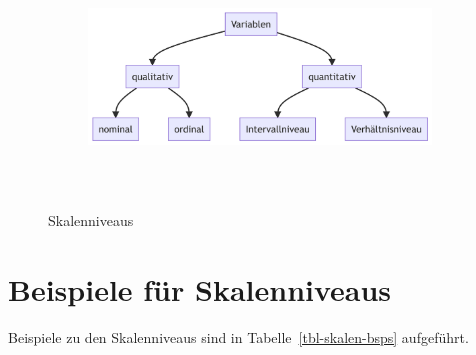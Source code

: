 \documentclass[
  a4paper,
  DIV=11]{scrreprt}
\theoremstyle{definition}
\theoremstyle{definition}
\theoremstyle{remark}
\begin{document}
\begin{figure}

{\centering 

\begin{figure}[H]

{\centering \includegraphics[width=6.03in,height=2.41in]{./fragenstellen_files/figure-latex/mermaid-figure-2.png}

}

\end{figure}

}

\caption{\label{fig-skalenniveau}Skalenniveaus}

\end{figure}

\hypertarget{beispiele-fuxfcr-skalenniveaus}{%
\section{Beispiele für
Skalenniveaus}\label{beispiele-fuxfcr-skalenniveaus}}

Beispiele zu den Skalenniveaus sind in Tabelle~\ref{tbl-skalen-bsps}
aufgeführt.
\end{document}
